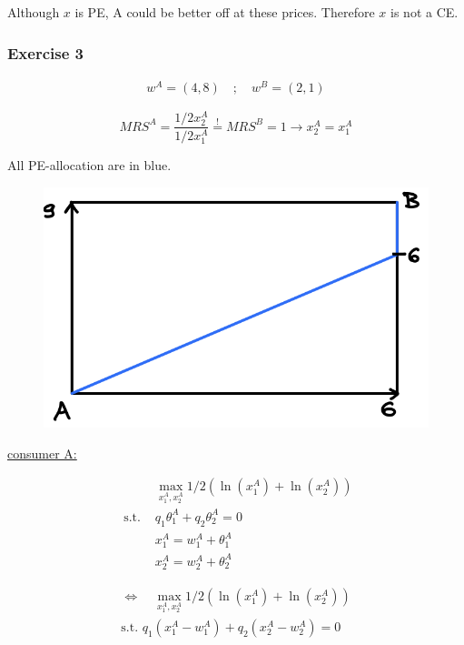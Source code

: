 {{Although $x$ is PE, A could be better off at these prices. Therefore $x$ is not a CE.
}
{
\subsubsection*{Exercise 3}

\begin{align*}
    w^{A}=(4,8) \quad ; \quad w^{B}=(2,1)
\end{align*}

\begin{enumerate}[label=(\alph*)]
{\item 
$$
MRS^{A}=\frac{1 / 2 x_{2}^{A}}{1 / 2 x_{1}^{A}} \stackrel{!}{=} M R S^{B}=1 \rightarrow x_{2}^{A}=x_{1}^{A}
$$

All PE-allocation are in blue.

\begin{figure}[!htp]
    \centering
    \includegraphics[width=.75\textwidth]{images/2020_21_3.png}
\end{figure}
}
{\item 
\underline{consumer A:}

\begin{align*}
    & \max_{x_{1}^{A}, x_{2}^{A}} 1 / 2\left(\ln \left(x_{1}^{A}\right)+\ln \left(x_{2}^{A}\right)\right) \\
    \text { s.t. } & q_{1} \theta_{1}^{A}+q_{2} \theta_{2}^{A}=0 \\
    & x_{1}^{A}=w_{1}^{A}+\theta_{1}^{A} \\
    & x_{2}^{A}=w_{2}^{A}+\theta_{2}^{A}
\end{align*}

\begin{align*}
    \Longleftrightarrow \quad \max _{x_{1}^{A} , x_{2}^{A}} 1 / 2\left(\ln \left(x_{1}^{A}\right)+\ln \left(x_{2}^{A}\right)\right) \\
    \text{s.t. } q_{1}\left(x_{1}^{A}-w_{1}^{A}\right)+q_{2}\left(x_{2}^{A}-w_{2}^{A}\right)=0
\end{align*}

}
\end{enumerate}}}
